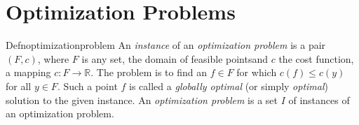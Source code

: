 \chapter{Optimization Problems}

\begin{reference}{Defn}{optimizationproblem}
  An \emph{instance} of an \emph{optimization problem} is a pair $(F,c)$, where $F$ is any set, the domain of feasible pointsand $c$ the cost function, a mapping $c:F\to \mathbb R$. The problem is to find an $f\in F$ for which $c(f)\leq c(y)$ for all $y\in F$. Such a point $f$ is called a \textit{globally optimal} (or simply \emph{optimal}) solution to the given instance. An \emph{optimization problem} is a set $I$ of instances of an optimization problem.
\end{reference}

